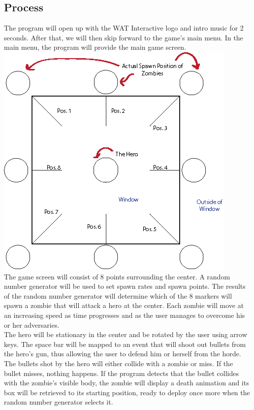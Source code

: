 \documentclass[12pt]{article}
\begin{document}
   \subsection{Process}
   The program will open up with the WAT Interactive logo and intro music for 2 seconds. 
   After that, we will then skip forward to the game's main menu. In the main menu, the 
   program will provide the main game screen. \\
   
   \includegraphics[scale=0.55]{zom_fig1.png} \\
   
   The game screen will consist of 8 points surrounding the center. A random number 
   generator will be used to set spawn rates and spawn points. The results of the random 
   number generator will determine which of the 8 markers will spawn a zombie that will 
   attack a hero at the center. Each zombie will move at an increasing speed as time 
   progresses and as the user manages to overcome his or her adversaries. \\
   
   The hero will be stationary in the center and be rotated by the user using arrow keys. 
   The space bar will be mapped to an event that will shoot out bullets from the hero's gun, 
   thus allowing the user to defend him or herself from the horde. \\
   
   The bullets shot by the hero will either collide with a zombie or miss. If the bullet misses, 
   nothing happens. If the program detects that the bullet collides with the zombie's 
   visible body, the zombie will display a death animation and its box will be retrieved 
   to its starting position, ready to deploy once more when the random number generator 
   selects it. \\
   
\end{document}
